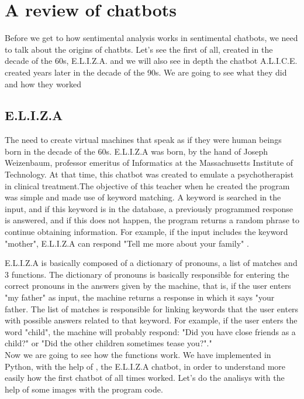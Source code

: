 \documentclass[12pt,twoside]{article}
\theoremstyle{plain}
\theoremstyle{definition}
\theoremstyle{remark}
\begin{document}
 


\section{A review of chatbots}
\label{sec:basics}
Before we get to how sentimental analysis works in sentimental chatbots, we need to talk about the origins of chatbts. Let's see the first of all, created in the decade of the 60s, E.L.I.Z.A. and we will also see in depth the chatbot A.L.I.C.E. created years later in the decade of the 90s. We are going to see what they did and how they worked

\subsection{E.L.I.Z.A}
	\label{sec:E.L.I.Z.A}
The need to create virtual machines that speak as if they were human beings born in the decade of the 60s. E.L.I.Z.A was born, by the hand of Joseph Weizenbaum, professor emeritus of Informatics at the Massachusetts Institute of Technology. At that time, this chatbot was created to emulate a psychotherapist in clinical treatment.The objective of this teacher when he created the program was simple and made use of keyword matching. A keyword is searched in the input, and if this keyword is in the database, a previously programmed response is answered, and if this does not happen, the program returns a random phrase to continue obtaining information. For example, if the input includes the keyword "mother", E.L.I.Z.A can respond "Tell me more about your family" \cite{shawar2007chatbots}.\\

\newpage

E.L.I.Z.A is basically composed of a dictionary of pronouns, a list of matches and 3 functions.\cite{joseph1966eliza} The dictionary of pronouns is basically responsible for entering the correct pronouns in the answers given by the machine, that is, if the user enters "my father" as input, the machine returns a response in which it says "your father. The list of matches is responsible for linking keywords that the user enters with possible answers related to that keyword. For example, if the user enters the word "child", the machine will probably respond: "Did you have close friends as a child?" or "Did the other children sometimes tease you?"."\cite{joseph1966eliza}\\

Now we are going to see how the functions work. We have implemented in Python, with the help of \cite{small2017}, the E.L.I.Z.A chatbot, in order to understand more easily how the first chatbot of all times worked. Let's do the analisys with the help of some images with the program code.\\
\end{document}
